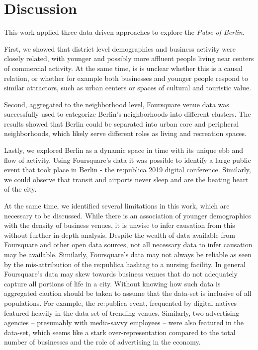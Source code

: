 \documentclass[letter]{scrartcl}
\begin{document}
\section{Discussion}
This work applied three data-driven approaches to explore the \emph{Pulse of Berlin}. 

First, we showed that district level demographics and business activity were closely related, with younger and possibly more affluent people living near centers of commercial activity. At the same time, is is unclear whether this is a causal relation, or whether for example both businesses and younger people respond to similar attractors, such as urban centers or spaces of cultural and touristic value. 

Second, aggregated to the neighborhood level, Foursquare venue data was successfully used to categorize Berlin's neighborhoods into different clusters. The results showed that Berlin could be separated into urban core and peripheral neighborhoods, which likely serve different roles as living and recreation spaces.

Lastly, we explored Berlin as a dynamic space in time with its unique ebb and flow of activity. Using Foursquare's data it was possible to identify a large public event that took place in Berlin - the re:publica 2019 digital conference. Similarly, we could observe that transit and airports never sleep and are the beating heart of the city. 

At the same time, we identified several limitations in this work, which are necessary to be discussed. 
While there is an association of younger demographics with the density of business venues, it is unwise to infer causation from this without further in-depth analysis. Despite the wealth of data available from Foursquare and other open data sources, not all necessary data to infer causation may be available. Similarly, Foursquare's data may not always be reliable as seen by the mis-attribution of the re:publica hashtag to a nursing facility. In general Foursquare's data may skew towards business venues that do not adequately capture all portions of life in a city. Without knowing how such data is aggregated caution should be taken to assume that the data-set is inclusive of all populations. For example, the re:publica event, frequented by digital natives featured heavily in the data-set of trending venues. Similarly, two advertising agencies -- presumably with media-savvy employees -- were also featured in the data-set, which seems like a stark over-representation compared to the total number of businesses and the role of advertising in the economy.  
\end{document}
